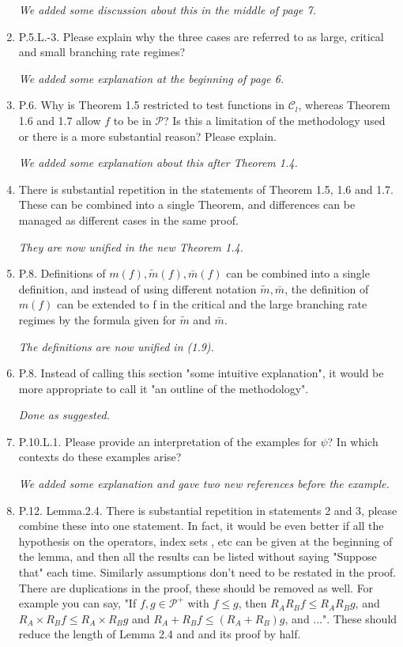 \documentclass[12pt,a4paper]{amsart}
\begin{document}
\begin{enumerate}
  \emph{We added some discussion about this in the middle of page 7.}

\item
  P.5.L.-3.
  Please explain why the three cases are referred to as large, critical and small branching rate regimes?

  \emph{We added some explanation at the beginning of page 6.}
\item
  P.6.
  Why is Theorem 1.5 restricted to test functions in $\mathcal C_l$, whereas Theorem 1.6 and 1.7 allow $f$ to be in $\mathcal P$?
  Is this a limitation of the methodology used or there is a more substantial reason?
  Please explain.

  \emph{We added some explanation about this after Theorem 1.4.}
\item
  There is substantial repetition in the statements of Theorem 1.5, 1.6 and 1.7.
  These can be combined into a single Theorem, and differences can be managed as different cases in the same proof.

  \emph{They are now unified in the new Theorem 1.4.}
\item
  P.8.
  Definitions of $m(f ), \tilde m(f ), \bar m(f )$ can be combined into a single definition, and instead of using different notation $\tilde m, \bar m$, the definition of $m(f)$ can be extended to f in the critical and the large branching rate regimes by the formula given for $\tilde m$ and $\bar m$.

  \emph{The definitions are now unified in (1.9).}
\item
  P.8.
  Instead of calling this section "some intuitive explanation", it would be more appropriate to call it "an outline of the methodology".

  \emph{Done as suggested.}
\item
  P.10.L.1.
  Please provide an interpretation of the examples for $\psi$?
  In which contexts do these examples arise?

  \emph{We added some explanation and gave two new references before the example.}

\item
  P.12. Lemma.2.4.
  There is substantial repetition in statements 2 and 3, please combine these into one statement.
  In fact, it would be even better if all the hypothesis on the operators, index sets , etc can be given at the beginning of the lemma, and then all the results can be listed without saying "Suppose that" each time.
  Similarly assumptions don't need to be restated in the proof.
  There are duplications in the proof, these should be removed as well.
  For example you can say, "If $f,g \in \mathcal P^+$ with $f \leq g$, then $R_AR_Bf \leq R_AR_Bg$, and $R_A \times R_B f \leq R_A \times R_B g$ and $R_A +R_B f \leq (R_A +R_B)g$, and ...".
  These should reduce the length of Lemma 2.4 and and its proof by half.


\end{enumerate}
\end{document}
